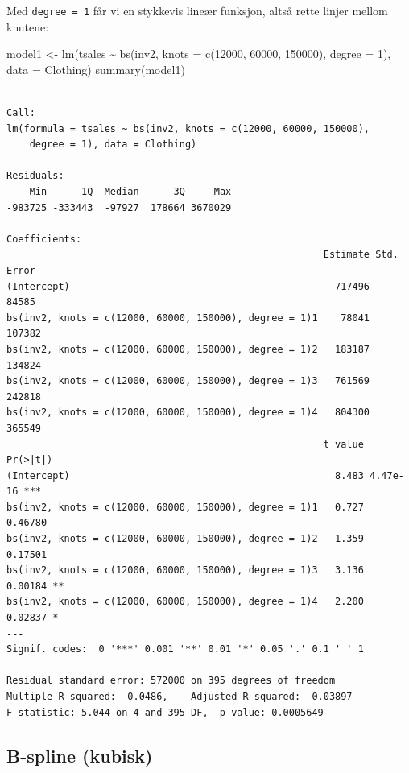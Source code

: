 \documentclass[
  letterpaper,
  DIV=11,
  numbers=noendperiod]{scrreprt}
\newenvironment{Shaded}{\begin{snugshade}}{\end{snugshade}}
\newcommand{\AttributeTok}[1]{\textcolor[rgb]{0.40,0.45,0.13}{#1}}
\newcommand{\DecValTok}[1]{\textcolor[rgb]{0.68,0.00,0.00}{#1}}
\newcommand{\FunctionTok}[1]{\textcolor[rgb]{0.28,0.35,0.67}{#1}}
\newcommand{\NormalTok}[1]{\textcolor[rgb]{0.00,0.23,0.31}{#1}}
\newcommand{\OtherTok}[1]{\textcolor[rgb]{0.00,0.23,0.31}{#1}}
\newcommand{\SpecialCharTok}[1]{\textcolor[rgb]{0.37,0.37,0.37}{#1}}
\begin{document}
Med \texttt{degree\ =\ 1} får vi en stykkevis lineær funksjon, altså
rette linjer mellom knutene:

\begin{Shaded}
\begin{Highlighting}[]
\NormalTok{model1 }\OtherTok{\textless{}{-}} \FunctionTok{lm}\NormalTok{(tsales }\SpecialCharTok{\textasciitilde{}} \FunctionTok{bs}\NormalTok{(inv2, }\AttributeTok{knots =} \FunctionTok{c}\NormalTok{(}\DecValTok{12000}\NormalTok{, }\DecValTok{60000}\NormalTok{, }\DecValTok{150000}\NormalTok{), }\AttributeTok{degree =} \DecValTok{1}\NormalTok{), }\AttributeTok{data =}\NormalTok{ Clothing)}
\FunctionTok{summary}\NormalTok{(model1)}
\end{Highlighting}
\end{Shaded}

\begin{verbatim}

Call:
lm(formula = tsales ~ bs(inv2, knots = c(12000, 60000, 150000), 
    degree = 1), data = Clothing)

Residuals:
    Min      1Q  Median      3Q     Max 
-983725 -333443  -97927  178664 3670029 

Coefficients:
                                                       Estimate Std. Error
(Intercept)                                              717496      84585
bs(inv2, knots = c(12000, 60000, 150000), degree = 1)1    78041     107382
bs(inv2, knots = c(12000, 60000, 150000), degree = 1)2   183187     134824
bs(inv2, knots = c(12000, 60000, 150000), degree = 1)3   761569     242818
bs(inv2, knots = c(12000, 60000, 150000), degree = 1)4   804300     365549
                                                       t value Pr(>|t|)    
(Intercept)                                              8.483 4.47e-16 ***
bs(inv2, knots = c(12000, 60000, 150000), degree = 1)1   0.727  0.46780    
bs(inv2, knots = c(12000, 60000, 150000), degree = 1)2   1.359  0.17501    
bs(inv2, knots = c(12000, 60000, 150000), degree = 1)3   3.136  0.00184 ** 
bs(inv2, knots = c(12000, 60000, 150000), degree = 1)4   2.200  0.02837 *  
---
Signif. codes:  0 '***' 0.001 '**' 0.01 '*' 0.05 '.' 0.1 ' ' 1

Residual standard error: 572000 on 395 degrees of freedom
Multiple R-squared:  0.0486,    Adjusted R-squared:  0.03897 
F-statistic: 5.044 on 4 and 395 DF,  p-value: 0.0005649
\end{verbatim}

\subsection{B-spline (kubisk)}\label{b-spline-kubisk}
\end{document}
